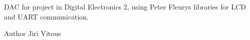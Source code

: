 D\+AC for project in Digital Electronics 2, using Peter Fleurys libraries for L\+CD and U\+A\+RT communication. \begin{DoxyAuthor}{Author}
Jiri Vitous 
\end{DoxyAuthor}
